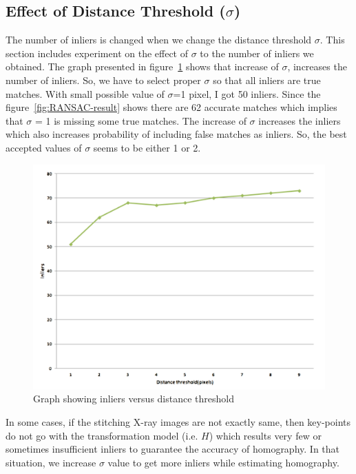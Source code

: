 \subsection{Effect of Distance Threshold ($\sigma$)}
The number of inliers is changed when we change the distance threshold $\sigma$. This section includes experiment on the effect of $\sigma$ to the number of inliers we obtained. The graph presented in figure~\ref{fig:inliers-vs-distance-threshold} shows that increase of $\sigma$, increases the number of inliers. So, we have to select proper $\sigma$ so that all inliers are true matches. With small possible value of $\sigma$=1 pixel, I got 50 inliers. Since the figure~\ref{fig:RANSAC-result} shows there are 62 accurate matches which implies that $\sigma$ = 1 is missing some true matches. The increase of $\sigma$ increases the inliers which also increases probability of including false matches as inliers. So, the best accepted values of $\sigma$ seems to be either 1 or 2. 

\begin{figure}[H]%
\centering
\includegraphics[width=1.0\columnwidth]{2.mainmatter/2.Methodology/figures/Inliers-threshold}%
\caption[Distance Threshold and Inliers Count]{Graph showing inliers versus distance threshold}%
\label{fig:inliers-vs-distance-threshold}%
\end{figure}

\noindent In some cases, if the stitching X-ray images are not exactly same, then key-points do not go with the transformation model (i.e. $H$) which results very few or sometimes insufficient inliers to guarantee the accuracy of homography. In that situation, we increase $\sigma$ value to get more inliers while estimating homography.\\

